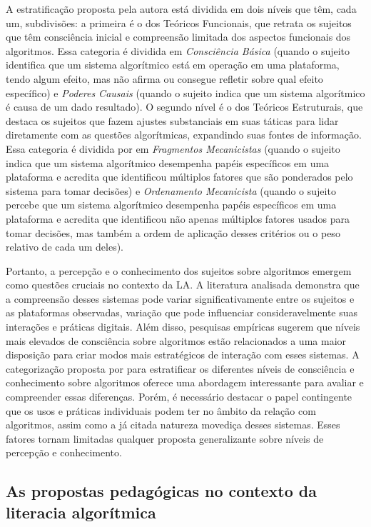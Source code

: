 A estratificação proposta pela autora está dividida em dois níveis que
têm, cada um, subdivisões: a primeira é o dos Teóricos Funcionais, que
retrata os sujeitos que têm consciência inicial e compreensão limitada
dos aspectos funcionais dos algoritmos. Essa categoria é dividida em
\emph{Consciência Básica} (quando o sujeito identifica que um sistema
algorítmico está em operação em uma plataforma, tendo algum efeito, mas
não afirma ou consegue refletir sobre qual efeito específico) e
\emph{Poderes Causais} (quando o sujeito indica que um sistema
algorítmico é causa de um dado resultado). O segundo nível é o dos
Teóricos Estruturais, que destaca os sujeitos que fazem ajustes
substanciais em suas táticas para lidar diretamente com as questões
algorítmicas, expandindo suas fontes de informação. Essa categoria é
dividida por \textcite{Devito2021} em \emph{Fragmentos Mecanicistas} (quando o
sujeito indica que um sistema algorítmico desempenha papéis específicos
em uma plataforma e acredita que identificou múltiplos fatores que são
ponderados pelo sistema para tomar decisões) e \emph{Ordenamento
Mecanicista} (quando o sujeito percebe que um sistema algorítmico
desempenha papéis específicos em uma plataforma e acredita que
identificou não apenas múltiplos fatores usados para tomar decisões, mas
também a ordem de aplicação desses critérios ou o peso relativo de cada
um deles).

Portanto, a percepção e o conhecimento dos sujeitos sobre algoritmos
emergem como questões cruciais no contexto da LA. A literatura analisada
demonstra que a compreensão desses sistemas pode variar
significativamente entre os sujeitos e as plataformas observadas,
variação que pode influenciar consideravelmente suas interações e
práticas digitais. Além disso, pesquisas empíricas sugerem que níveis
mais elevados de consciência sobre algoritmos estão relacionados a uma
maior disposição para criar modos mais estratégicos de interação com
esses sistemas. A categorização proposta por \textcite{Devito2021} para
estratificar os diferentes níveis de consciência e conhecimento sobre
algoritmos oferece uma abordagem interessante para avaliar e compreender
essas diferenças. Porém, é necessário destacar o papel contingente que
os usos e práticas individuais podem ter no âmbito da relação com
algoritmos, assim como a já citada natureza movediça desses sistemas.
Esses fatores tornam limitadas qualquer proposta generalizante sobre
níveis de percepção e conhecimento.

\subsection{As propostas pedagógicas no contexto da literacia
algorítmica}\label{sub-sec-aspropostaspedagogicas}

